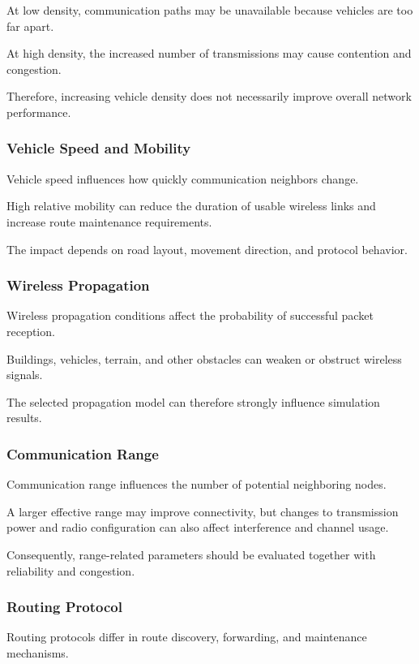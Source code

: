 At low density, communication
paths may be unavailable because
vehicles are too far apart.

At high density, the increased
number of transmissions may
cause contention and congestion.

Therefore, increasing vehicle
density does not necessarily
improve overall network performance.

\subsubsection{Vehicle Speed and Mobility}

Vehicle speed influences how
quickly communication neighbors
change.

High relative mobility can
reduce the duration of usable
wireless links and increase
route maintenance requirements.

The impact depends on road
layout, movement direction,
and protocol behavior.

\subsubsection{Wireless Propagation}

Wireless propagation conditions
affect the probability of
successful packet reception.

Buildings, vehicles, terrain,
and other obstacles can weaken
or obstruct wireless signals.

The selected propagation model
can therefore strongly influence
simulation results.

\subsubsection{Communication Range}

Communication range influences
the number of potential
neighboring nodes.

A larger effective range may
improve connectivity, but changes
to transmission power and radio
configuration can also affect
interference and channel usage.

Consequently, range-related
parameters should be evaluated
together with reliability
and congestion.

\subsubsection{Routing Protocol}

Routing protocols differ in
route discovery, forwarding,
and maintenance mechanisms.

